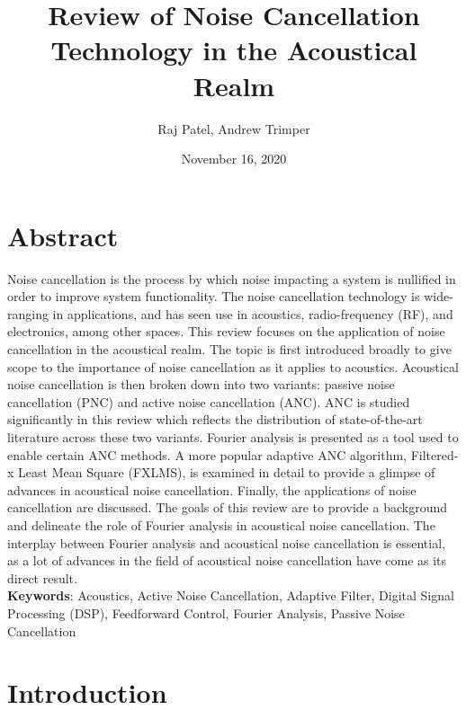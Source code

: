 \documentclass[11pt, letterpaper]{article}
\numberwithin{equation}{section}
\begin{document}
\title{Review of Noise Cancellation Technology in the Acoustical Realm}
\author{Raj Patel, Andrew Trimper}
\date{November 16, 2020}
\maketitle
\tableofcontents
\newpage

\section{Abstract}

Noise cancellation is the process by which noise impacting a system is nullified in order to improve system functionality. The noise cancellation technology is wide-ranging in applications, and has seen use in acoustics, radio-frequency (RF), and electronics, among other spaces. This review focuses on the application of noise cancellation in the acoustical realm. The topic is first introduced broadly to give scope to the importance of noise cancellation as it applies to acoustics. Acoustical noise cancellation is then broken down into two variants: passive noise cancellation (PNC) and active noise cancellation (ANC). ANC is studied significantly in this review which reflects the distribution of state-of-the-art literature across these two variants. Fourier analysis is presented as a tool used to enable certain ANC methods. A more popular adaptive ANC algorithm, Filtered-x Least Mean Square (FXLMS), is examined in detail to provide a glimpse of advances in acoustical noise cancellation. Finally, the applications of noise cancellation are discussed. The goals of this review are to provide a background and delineate the role of Fourier analysis in acoustical noise cancellation. The interplay between Fourier analysis and acoustical noise cancellation is essential, as a lot of advances in the field of acoustical noise cancellation have come as its direct result.
\\
\textbf{Keywords}: Acoustics, Active Noise Cancellation, Adaptive Filter, Digital Signal Processing (DSP), Feedforward Control, Fourier Analysis, Passive Noise Cancellation

\section{Introduction}
\end{document}

